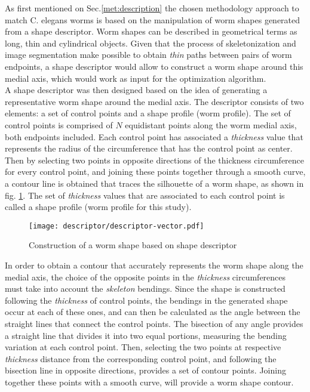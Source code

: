 As first mentioned on Sec.\ref{met:description} the chosen methodology approach 
to match C. elegans worms is based on the manipulation of 
worm shapes generated from a shape descriptor.
Worm shapes can be described in geometrical terms as long, thin and cylindrical 
objects. Given that the process of skeletonization and image segmentation 
make possible to obtain \emph{thin} paths between pairs of worm endpoints, 
a shape descriptor would allow to construct a worm shape around this
medial axis, which would work as input for the 
optimization algorithm. \\

A shape descriptor was then designed based on the idea of generating a representative
worm shape around the medial axis. The descriptor consists of two 
elements: a set of control points and a shape profile (worm profile). 
The set of control points is comprised of $N$ equidistant points 
along the worm medial axis, both endpoints included.
Each control point has associated a \emph{thickness} value that represents the
radius of the circumference that has the control point as center. Then by selecting two points
in opposite directions of the thickness circumference for every control point, and joining
these points together through a smooth curve, a contour line is obtained that traces
the silhouette of a worm shape, as shown in fig. \ref{fig:descriptor}. 
The set of \emph{thickness} values that are associated to each control point
is called a shape profile (worm profile for this study).

\begin{figure}[h t b p ! H]
 \centering
   \texttt{[image: descriptor/descriptor-vector.pdf]}
 \caption{Construction of a worm shape based on shape descriptor}
 \label{fig:descriptor}
\end{figure}

In order to obtain a contour that accurately represents the worm shape along the 
medial axis, the choice of the opposite points in the \emph{thickness} circumferences 
must take into account the \emph{skeleton} bendings.
Since the shape is constructed following the \emph{thickness} of control points,
the bendings in the generated shape occur at each of these ones, and can then 
be calculated as the angle between the straight lines that connect
the control points. 
The bisection of any angle provides a straight line that divides it
into two equal portions, measuring the bending variation at each control point.
Then, selecting the two points at respective \emph{thickness} distance 
from the corresponding control point, and following the bisection line in opposite directions, provides a set of contour points. Joining 
together these points with a smooth curve, will provide a worm shape contour.\\

